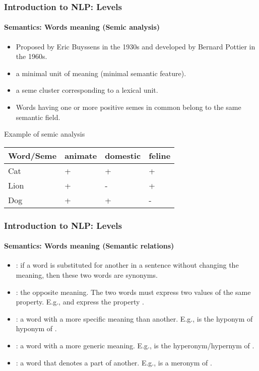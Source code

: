 \documentclass[xcolor=table]{beamer}
\begin{document}
\begin{frame}
\frametitle{Introduction to NLP: Levels}
\framesubtitle{Semantics: Words meaning (Semic analysis)}

\begin{itemize}
	\item Proposed by Eric Buyssens in the 1930s and developed by Bernard Pottier in the 1960s.
	\item {} a minimal unit of meaning (minimal semantic feature).
	\item {} a seme cluster corresponding to a lexical unit.
	\item Words having one or more positive semes in common belong to the same semantic field.
\end{itemize}

\begin{exampleblock}{Example of semic analysis}
	\centering
	\begin{tabular}{|l|l|l|l|}
		\hline
		Word/Seme & animate & domestic & feline \\
		\hline
		Cat & + & + & + \\
		\hline
		Lion & + & - & + \\
		\hline
		Dog & + & + & - \\
		\hline
	\end{tabular}
\end{exampleblock}

\end{frame}

\begin{frame}
\frametitle{Introduction to NLP: Levels}
\framesubtitle{Semantics: Words meaning (Semantic relations)}

\begin{itemize}
	\item {}: if a word is substituted for another in a sentence without changing the meaning, then these two words are synonyms.
	\item {}: the opposite meaning. The two words must express two values of the same property. E.g.,  and  express the property .
	
	\item {}: a word with a more specific meaning than another.
	E.g.,  is the hyponym of  hyponym of .
	 
	\item {}: a word with a more generic meaning.
	E.g.,  is the hyperonym/hypernym of .
	
	\item {}: a word that denotes a part of another.
	E.g.,  is a meronym of .
\end{itemize}

\end{frame}
\end{document}
